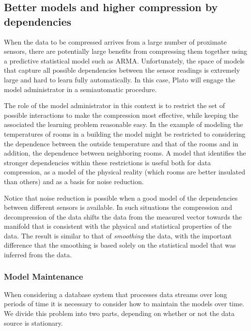 \subsection{Better models and higher compression by dependencies}
\label{sec:dependencies}

When the data to be compressed arrives from a large number of
proximate sensors, there are potentially large benefits from
compressing them together using a predictive statistical model such as
ARMA. Unfortunately, the space of models that capture all possible dependencies
between the sensor readings is extremely large and hard to learn fully automatically.
In this case, Plato will engage the model administrator in a semiautomatic procedure.

The role of the model administrator in this context is to restrict the set
of possible interactions to make the compression most effective,
while keeping the associated the learning problem reasonable easy. In the
example of modeling the temperatures of rooms in a building the model
might be restricted to considering the dependence between the outside
temperature and that of the rooms and in addition, the dependence
between neighboring rooms. A model that identifies the stronger
dependencies within these restrictions is useful both for data
compression, as a model of the physical reality (which rooms are
better insulated than others) and as a basis for noise reduction.

Notice that noise reduction is
possible when a good model of the dependencies between different
sensors is available. In such situations the compression and
decompression of the data shifts the data from the measured vector
towards the manifold that is consistent with the physical and
statistical properties of the data. The result is similar to that of
{\em smoothing} the data, with the important difference that the
smoothing is based solely on the statistical model that was inferred from the data.



\subsubsection{Model Maintenance}

When considering a database system that processes data streams over
long periods of time it is necessary to consider how to maintain the
models over time. We divide this problem into two parts, depending on
whether or not the data source is stationary.

